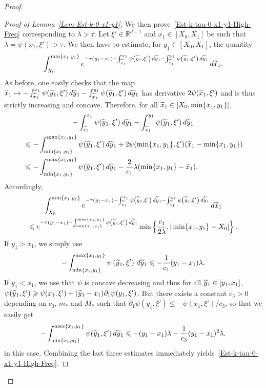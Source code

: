 \documentclass[10pt]{amsart}
\theoremstyle{definition}\newtheorem{defi}[theo]{Definition}\newtheorem{rema}[theo]{Remark}\newtheorem{exam}[theo]{Example}\newtheorem{exem}[theo]{Example}\newtheorem{nota}[theo]{Notation}
\newcommand*\R{\mathbb{R}}
\renewcommand{\leq}{\leqslant}
\renewcommand{\geq}{\geqslant}
\renewcommand{\tilde}{\widetilde}
\let\oldtilde\tilde
\renewcommand*{\tilde}[1]{\mathchoice{\widetilde{#1}}{\widetilde{#1}}{\oldtilde{#1}}{\oldtilde{#1}}}
\begin{document}
\begin{proof}
\begin{proof}[Proof of Lemma~\ref{Lem-Est-k-0-x1-y1}]
We then prove~\eqref{Est-k-tau-0-x1-y1-High-Freq} corresponding to $\lambda > \tau$. Let $\xi' \in \R^{d-1}$ and $x_1 \in [X_0,X_1]$ be such that $\lambda = \psi(x_1, \xi') > \tau$. We then have to estimate, for $y_1 \in [X_0,X_1]$, the quantity
\[
\int_{X_0}^{\min \{ x_1, y_1\}} e^{-\tau(y_1-x_1)-\int_{\tilde{x}_1}^{x_1} \psi\left(\tilde{y}_1,\xi'\right) \, d\tilde{y}_1 - \int_{{\tilde{x}_1}}^{y_1} \psi\left(\tilde{y}_1,\xi'\right) \,d \tilde{y}_1 } \, d \tilde{x}_1.
\]
As before, one easily checks that the map $\tilde x_1 \mapsto -\int_{\tilde{x}_1}^{x_1} \psi(\tilde{y}_1,\xi') \, d\tilde{y}_1 - \int_{{\tilde{x}_1}}^{y_1} \psi(\tilde{y}_1,\xi') \,d \tilde{y}_1$ has derivative $2 \psi(\tilde x_1, \xi')$ and is thus strictly increasing and concave. Therefore, for all $\tilde x_1 \in [X_0, \min\{x_1,y_1\}]$,
\begin{multline*}
-\int_{\tilde{x}_1}^{x_1} \psi(\tilde{y}_1,\xi') \, d\tilde{y}_1 - \int_{{\tilde{x}_1}}^{y_1} \psi(\tilde{y}_1,\xi') \,d \tilde{y}_1
\\
\begin{aligned}
& \leq - \int_{\min\{x_1,y_1\}}^{\max\{x_1,y_1\}} \psi(\tilde{y}_1,\xi') \, d\tilde{y}_1 + 2 \psi(\min\{x_1, y_1\}, \xi') (\tilde x_1 - \min\{x_1, y_1\})
\\
& \leq - \int_{\min\{x_1,y_1\}}^{\max\{x_1,y_1\}} \psi(\tilde{y}_1,\xi') \, d\tilde{y}_1 - \frac{2}{c_1} \lambda (\min\{x_1, y_1\} - \tilde x_1).
\end{aligned}
\end{multline*}
Accordingly,
\begin{multline*}
\int_{X_0}^{\min \{ x_1, y_1\}} e^{-\tau(y_1-x_1)-\int_{\tilde{x}_1}^{x_1} \psi\left(\tilde{y}_1,\xi'\right) \, d\tilde{y}_1 - \int_{{\tilde{x}_1}}^{y_1} \psi\left(\tilde{y}_1,\xi'\right) \,d \tilde{y}_1 } \, d \tilde{x}_1
\\
\leq e^{-\tau (y_1 - x_1) - \int_{\min\{x_1,y_1\}}^{\max\{x_1,y_1\}} \psi\left(\tilde{y}_1,\xi'\right) \, d\tilde{y}_1 } \min\left\{ \frac{c_1}{2 \lambda}, |\min\{x_1, y_1\} - X_0| \right\}.
\end{multline*}
If $y_1 > x_1$, we simply use
\[
- \int_{\min\{x_1,y_1\}}^{\max\{x_1,y_1\}} \psi\left(\tilde{y}_1,\xi'\right) \, d\tilde{y}_1
\leq - \frac{1}{c_1} (y_1- x_1) \lambda.
\]
If $y_1 < x_1$, we use that $\psi$ is concave decreasing and thus for all $\tilde y_1 \in [y_1, x_1]$, $\psi(\tilde y_1, \xi') \geq \psi(x_1, \xi') + (\tilde y_1 - x_1) \partial_1 \psi(y_1, \xi')$. But there exists a constant $c_3>0$ depending on $c_0$, $m_*$ and $M_*$ such that $\partial_1 \psi(y_1, \xi') \leq - \psi(x_1, \xi')/c_3$, so that we easily get
\[
- \int_{\min\{x_1,y_1\}}^{\max\{x_1,y_1\}} \psi(\tilde{y}_1,\xi') \, d\tilde{y}_1
\leq - (y_1- x_1) \lambda - \frac{1}{c_3} (y_1- x_1)^2 \lambda.
\]
in this case. Combining the last three estimates immediately yields~\eqref{Est-k-tau-0-x1-y1-High-Freq}.


\end{proof}
\end{proof}
\end{document}
